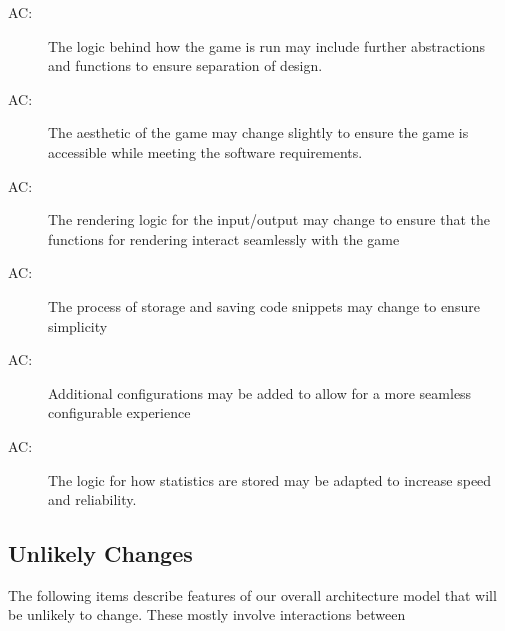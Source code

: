 \documentclass[12pt, titlepage]{article}
\newcounter{acnum}
\newcommand{\actheacnum}{AC\theacnum}
\begin{document}

\begin{description}
\item[ \actheacnum \label{acGame}:] The logic behind how the game is run may include further abstractions and functions to ensure separation of design.
\item[ \actheacnum \label{acAe}:] The aesthetic of the game may change slightly to ensure the game is accessible while meeting the software requirements.
\item [ \actheacnum \label{acSc}:] The rendering logic for the input/output may change to ensure that the functions for rendering interact seamlessly with the game
\item [ \actheacnum \label{acSn}:] The process of storage and saving code snippets may change to ensure simplicity
\item [ \actheacnum \label{acCg}:] Additional configurations may be added to allow for a more seamless configurable experience
\item [ \actheacnum \label{acSt}:] The logic for how statistics are stored may be adapted to increase speed and reliability.
\end{description}

\subsection{Unlikely Changes} \label{SecUchange}

The following items describe features of our overall architecture model that will be unlikely to change. These mostly involve interactions between

\end{document}
